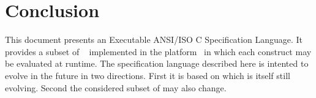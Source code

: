 
\chapter{Conclusion}

This document presents an Executable ANSI/ISO C Specification
Language. It provides a subset of \acsl~\cite{acsl} implemented in the
\framac platform~\cite{framac} in which each construct may be
evaluated at runtime. The specification language described here is
intented to evolve in the future in two directions. First it is based
on \acsl which is itself still evolving. Second the considered subset
of \acsl may also change.
